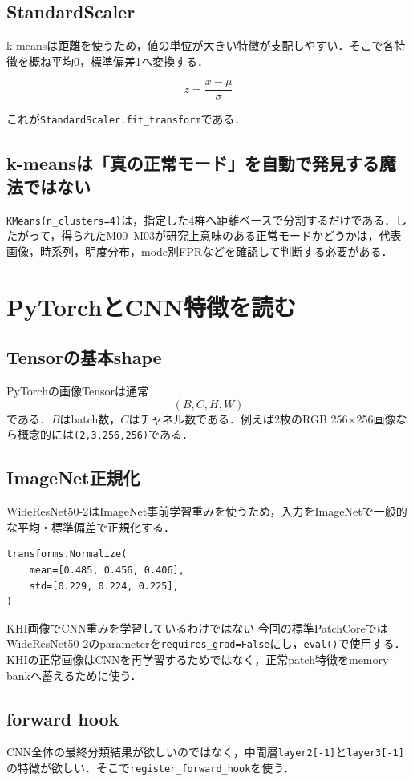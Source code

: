 \documentclass[a4paper,11pt]{ltjsreport}
\begin{document}
\section{StandardScaler}
k-meansは距離を使うため，値の単位が大きい特徴が支配しやすい．そこで各特徴を概ね平均0，標準偏差1へ変換する．

\[
z=\frac{x-\mu}{\sigma}
\]

これが\texttt{StandardScaler.fit\_transform}である．

\section{k-meansは「真の正常モード」を自動で発見する魔法ではない}
\texttt{KMeans(n\_clusters=4)}は，指定した4群へ距離ベースで分割するだけである．したがって，得られたM00--M03が研究上意味のある正常モードかどうかは，代表画像，時系列，明度分布，mode別FPRなどを確認して判断する必要がある．

\chapter{PyTorchとCNN特徴を読む}

\section{Tensorの基本shape}
PyTorchの画像Tensorは通常
\[
(B,C,H,W)
\]
である．\(B\)はbatch数，\(C\)はチャネル数である．例えば2枚のRGB 256×256画像なら概念的には\texttt{(2,3,256,256)}である．

\section{ImageNet正規化}
WideResNet50-2はImageNet事前学習重みを使うため，入力をImageNetで一般的な平均・標準偏差で正規化する．

\begin{lstlisting}
transforms.Normalize(
    mean=[0.485, 0.456, 0.406],
    std=[0.229, 0.224, 0.225],
)
\end{lstlisting}

\begin{warnbox}{KHI画像でCNN重みを学習しているわけではない}
今回の標準PatchCoreではWideResNet50-2のparameterを\texttt{requires\_grad=False}にし，\texttt{eval()}で使用する．KHIの正常画像はCNNを再学習するためではなく，正常patch特徴をmemory bankへ蓄えるために使う．
\end{warnbox}

\section{forward hook}
CNN全体の最終分類結果が欲しいのではなく，中間層\texttt{layer2[-1]}と\texttt{layer3[-1]}の特徴が欲しい．そこで\texttt{register\_forward\_hook}を使う．
\end{document}
